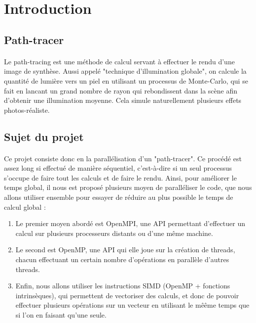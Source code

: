 \documentclass{article}
\begin{document}
\tableofcontents

\newpage

\section{Introduction}

\subsection{Path-tracer}
\paragraph{}
Le path-tracing est une m\'ethode de calcul servant \`a effectuer le rendu d'une image de synth\`ese. 
Aussi appel\'e "technique d'illumination globale", on calcule la quantit\'e de lumi\`ere vers un piel en utilisant un
processus de Monte-Carlo, qui se fait en lancant un grand nombre de rayon qui rebondissent dans la sc\`ene afin d'obtenir une illumination moyenne.
Cela simule naturellement plusieurs effets photos-r\'ealiste.

\subsection{Sujet du projet}
\paragraph{}
Ce projet consiste donc en la parall\'elisation d'un "path-tracer". 
Ce proc\'ed\'e est assez long si effectu\'e de mani\`ere s\'equentiel, 
c'est-\`a-dire si un seul processus s'occupe de faire tout les calculs et de faire le rendu.
Ainsi, pour am\'eliorer le temps global, il nous est propos\'e plusieurs moyen de parall\'eliser le code, que nous allons utiliser ensemble pour essayer de r\'eduire au plus possible le temps de calcul global :

\begin{enumerate}
  \item Le premier moyen abord\'e est OpenMPI, une API permettant d'effectuer un calcul sur plusieurs processeurs distants ou d'une m\^eme machine.
  \item Le second est OpenMP, une API qui elle joue sur la cr\'eation de threads, chacun effectuant un certain nombre d'op\'erations en parall\`ele d'autres threads.
  \item Enfin, nous allons utiliser les instructions SIMD (OpenMP + fonctions intrins\`eques), qui permettent de vectoriser des calculs, et donc de pouvoir effectuer plusieurs op\'erations sur un vecteur en utilisant le mêême temps que si l'on en faisant qu'une seule.
\end{enumerate}
\end{document}

